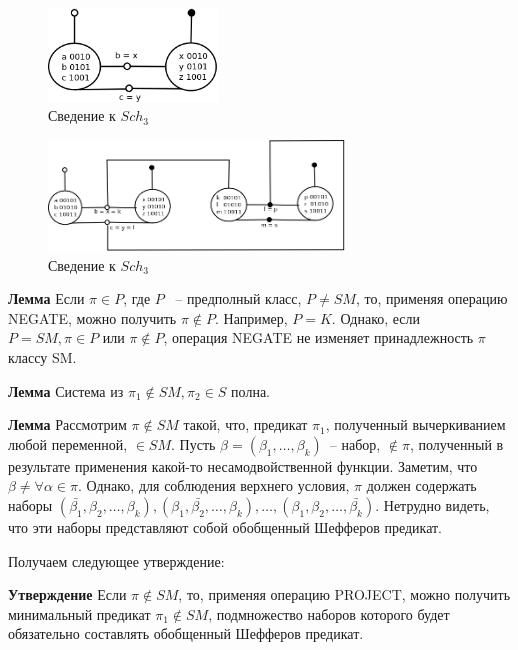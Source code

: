\documentclass[12pt]{article}
\begin{document}
\begin{figure}[htb]
\centering
\includegraphics[width=0.4\textwidth]{scheff4.png}
\caption{Сведение к $Sch_3$}
\label{fig:scheff3_4}
\end{figure}


\begin{figure}[htb]
\centering
\includegraphics[width=0.7\textwidth]{scheff5.png}
\caption{Сведение к $Sch_3$}
\label{fig:scheff3_5}
\end{figure}

\textbf{Лемма} Если $\pi \in P$, где $P$ ~-- предполный класс, $P \neq SM$, то, применяя операцию NEGATE,
можно получить $\pi \notin P$. Например, $P = K$.
Однако, если $P = SM, \pi \in P$ или $\pi \notin P$, операция NEGATE не изменяет принадлежность $\pi$ классу SM.

\textbf{Лемма} Система из $\pi_1 \notin SM, \pi_2 \in S$ полна.

\label{eq:lemma_sm}
\textbf{Лемма} Рассмотрим $\pi \notin SM$ такой, что, предикат $\pi_1$, полученный вычеркиванием любой переменной, $\in SM$.
Пусть $\beta = (\beta_1, \dots, \beta_k)$~-- набор, $\notin \pi$, полученный в результате применения какой-то несамодвойственной функции.
Заметим, что $\beta \neq \forall \alpha \in \pi$. Однако, для соблюдения верхнего условия, $\pi$ должен содержать наборы 
$(\bar{\beta_1}, \beta_2, \dots, \beta_k), (\beta_1, \bar{\beta_2}, \dots, \beta_k), \dots, (\beta_1, \beta_2, \dots, \bar{\beta_k})$.
Нетрудно видеть, что эти наборы представляют собой обобщенный Шефферов предикат. 

Получаем следующее утверждение: 

\textbf{Утверждение} Если $\pi \notin SM$, то, применяя операцию PROJECT, можно получить минимальный предикат $\pi_1 \notin SM$, 
подмножество наборов которого будет обязательно составлять обобщенный Шефферов предикат.
\end{document}

